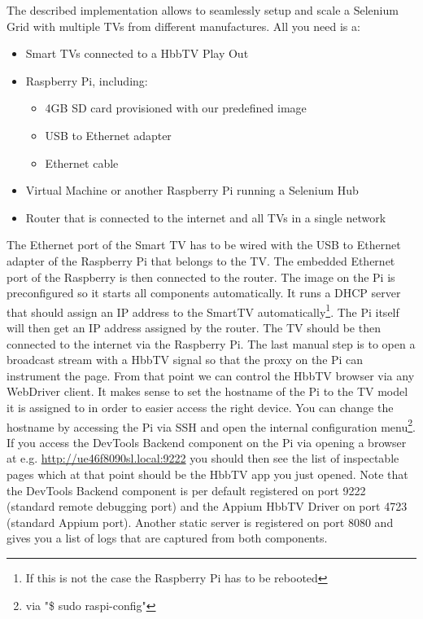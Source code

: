 The described implementation allows to seamlessly setup and scale a Selenium Grid with multiple TVs from different
manufactures. All you need is a:

\begin{itemize}
  \item Smart TVs connected to a HbbTV Play Out
  \item Raspberry Pi, including:
    \begin{itemize}
      \item 4GB SD card provisioned with our predefined image
      \item USB to Ethernet adapter
      \item Ethernet cable
    \end{itemize}
  \item Virtual Machine or another Raspberry Pi running a Selenium Hub
  \item Router that is connected to the internet and all TVs in a single network
\end{itemize}

The Ethernet port of the Smart TV has to be wired with the USB to Ethernet adapter of the Raspberry Pi that belongs
to the TV. The embedded Ethernet port of the Raspberry is then connected to the router. The image on the Pi is
preconfigured so it starts all components automatically. It runs a DHCP server that should assign an IP address to the
SmartTV automatically\footnote{If this is not the case the Raspberry Pi has to be rebooted}. The Pi itself will then
get an IP address assigned by the router. The TV should be then connected to the internet via the Raspberry Pi. The
last manual step is to open a broadcast stream with a HbbTV signal so that the proxy on the Pi can instrument the page.
From that point we can control the HbbTV browser via any WebDriver client. It makes sense to set the hostname of the Pi
to the TV model it is assigned to in order to easier access the right device. You can change the hostname by accessing
the Pi via SSH and open the internal configuration menu\footnote{via "\$ sudo raspi-config"}. If you access the DevTools
Backend component on the Pi via opening a browser at e.g. \url{http://ue46f8090sl.local:9222} you should then see the
list of inspectable pages which at that point should be the HbbTV app you just opened. Note that the DevTools Backend
component is per default registered on port 9222 (standard remote debugging port) and the Appium HbbTV Driver on port
4723 (standard Appium port). Another static server is registered on port 8080 and gives you a list of logs that are
captured from both components.

